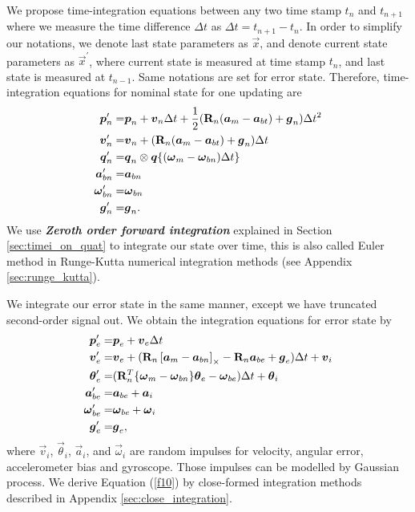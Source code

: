 We propose time-integration equations between any two time stamp $t_n$ and $t_{n+1}$ where we measure the time difference $\Delta{t}$ as $\Delta{t} = t_{n+1} - t_{n}$. In order to simplify our notations, we denote last state parameters as $\vec{x}$, and denote current state parameters as $\vec{x}^{\prime}$, where current state is measured at time stamp $t_{n}$, and last state is measured at $t_{n-1}$. Same notations are set for error state. Therefore, time-integration equations for nominal state for one updating are
\begin{align}
	\boldsymbol{p}_n^{\prime} =& \boldsymbol{p}_n + \boldsymbol{v}_n\Delta{t} + \frac{1}{2}(\mathbf{R}_n(\boldsymbol{a}_m - \boldsymbol{a}_{bt}) + \boldsymbol{g}_n)\Delta{t}^2 \\
	\boldsymbol{v}_n^{\prime} =& \boldsymbol{v}_n + (\mathbf{R}_n(\boldsymbol{a}_m - \boldsymbol{a}_{bt}) + \boldsymbol{g}_n)\Delta{t}\\
	\label{f9}
	\boldsymbol{q}_n^{\prime} =& \boldsymbol{q}_n \otimes \boldsymbol{q}\{(\boldsymbol{\omega}_m - \boldsymbol{\omega}_{bn})\Delta{t}\}\\
	\boldsymbol{a}_{bn}^{\prime} =& \boldsymbol{a}_{bn} \\
	\boldsymbol{\omega}_{bn}^{\prime} =& \boldsymbol{\omega}_{bn} \\ 
	\boldsymbol{g}_n^{\prime} =& \boldsymbol{g}_n.
\end{align}
We use \textbf{\textit{Zeroth order forward integration}} explained in Section \ref{sec:timei_on_quat} to integrate our state over time, this is also called Euler method in Runge-Kutta numerical integration methods (see Appendix \ref{sec:runge_kutta}).

We integrate our error state in the same manner, except we have truncated second-order signal out. We obtain the integration equations for error state by
\begin{align}
	\boldsymbol{p}_e^{\prime} =& \boldsymbol{p}_e + \boldsymbol{v}_e \Delta{t}\\
	\boldsymbol{v}_e^{\prime} =& \boldsymbol{v}_e + (\mathbf{R}_n \left[ \boldsymbol{a}_m - \boldsymbol{a}_{bn} \right]_{\times} -  \mathbf{R}_n\boldsymbol{a}_{be} + \boldsymbol{g}_e)\Delta{t} + \boldsymbol{v}_i\\
	\label{f10}
	\boldsymbol{\theta}_e^{\prime} =& (\mathbf{R}_n^T \{ \boldsymbol{\omega}_m - \boldsymbol{\omega}_{bn} \} \boldsymbol{\theta}_e - \boldsymbol{\omega}_{be})\Delta{t} + \boldsymbol{\theta}_{i}\\
	\boldsymbol{a}_{be}^{\prime} =& \boldsymbol{a}_{be} + \boldsymbol{a}_i\\
	\boldsymbol{\omega}_{be}^{\prime} =& \boldsymbol{\omega}_{be} + \boldsymbol{\omega}_i\\ 
	\boldsymbol{g}_e^{\prime} =& \boldsymbol{g}_e,
\end{align}
where $\vec{v}_i$, $\vec{\theta}_{i}$, $\vec{a}_i$, and $\vec{\omega}_i$ are random impulses for velocity, angular error, accelerometer bias and gyroscope. Those impulses can be modelled by Gaussian process. We derive Equation (\ref{f10}) by close-formed integration methods described in Appendix \ref{sec:close_integration}.

